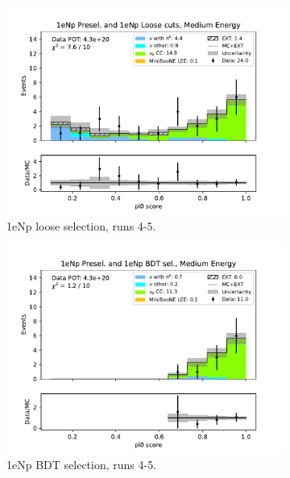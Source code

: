 \begin{figure}[H]
\begin{subfigure}{0.33\linewidth}
        \includegraphics[width=\linewidth]{technote/Sidebands/Figures/NearSideband/near_sideband_pi0_score_run4b4c4d5_NP_NPL_MEDIUM_ENERGY.pdf}
        \caption{1eNp loose selection, runs 4-5.}
    \end{subfigure}%
    \begin{subfigure}{0.33\linewidth}
        \includegraphics[width=\linewidth]{technote/Sidebands/Figures/NearSideband/near_sideband_pi0_score_run4b4c4d5_NP_NPBDT_MEDIUM_ENERGY.pdf}
        \caption{1eNp BDT selection, runs 4-5.}
    \end{subfigure}
    \begin{subfigure}{0.33\linewidth}

\end{subfigure}
\end{figure}
